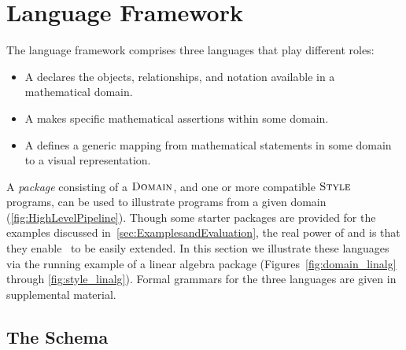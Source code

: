 

\section{Language Framework}
\label{sec:LanguageFramework}

The \Penrose{} language framework comprises three languages that play different roles:

\begin{itemize}
   \item A  declares the objects, relationships, and notation available in a mathematical domain.
   \item A  makes specific mathematical assertions within some domain.
   \item A  defines a generic mapping from mathematical statements in some domain to a visual representation.
\end{itemize}

A \emph{package} consisting of a \(\textsc{Domain}{}\), and one or more compatible \(\textsc{Style}{}\) programs, can be used to illustrate \Substance{} programs from a given domain (\cref{fig:HighLevelPipeline}).  Though some starter packages are provided for the examples discussed in~\cref{sec:ExamplesandEvaluation}, the real power of \Style{} and \Domain{} is that they enable \Penrose\ to be easily extended.  In this section we illustrate these languages via the running example of a linear algebra package (Figures~\ref{fig:domain_linalg} through \ref{fig:style_linalg}).  Formal grammars for the three languages are given in supplemental material.



\subsection{The \Domain{} Schema}
\label{sec:TheDomainSchema}

